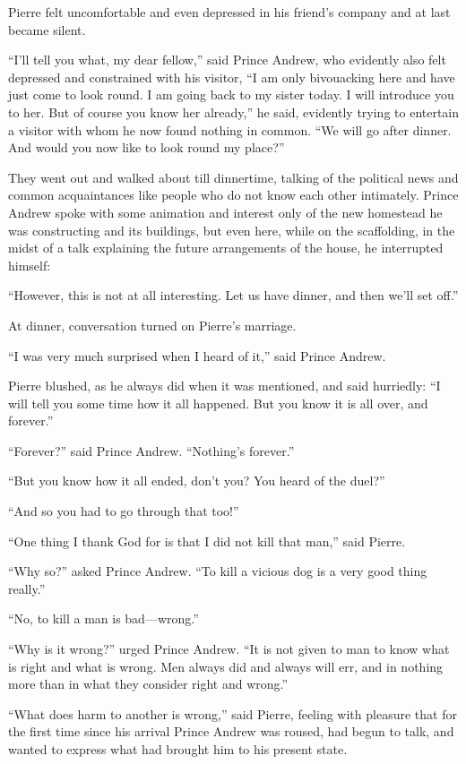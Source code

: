 Pierre felt uncomfortable and even depressed in his friend's
company and at last became silent.

``I'll tell you what, my dear fellow,'' said Prince Andrew, who
evidently also felt depressed and constrained with his visitor,
``I am only bivouacking here and have just come to look round. I
am going back to my sister today. I will introduce you to
her. But of course you know her already,'' he said, evidently
trying to entertain a visitor with whom he now found nothing in
common. ``We will go after dinner. And would you now like to look
round my place?''

They went out and walked about till dinnertime, talking of the
political news and common acquaintances like people who do not
know each other intimately. Prince Andrew spoke with some
animation and interest only of the new homestead he was
constructing and its buildings, but even here, while on the
scaffolding, in the midst of a talk explaining the future
arrangements of the house, he interrupted himself:

``However, this is not at all interesting. Let us have dinner,
and then we'll set off.''

At dinner, conversation turned on Pierre's marriage.

``I was very much surprised when I heard of it,'' said Prince
Andrew.

Pierre blushed, as he always did when it was mentioned, and said
hurriedly: ``I will tell you some time how it all happened. But
you know it is all over, and forever.''

``Forever?'' said Prince Andrew. ``Nothing's forever.''

``But you know how it all ended, don't you? You heard of the
duel?''

``And so you had to go through that too!''

``One thing I thank God for is that I did not kill that man,''
said Pierre.

``Why so?'' asked Prince Andrew. ``To kill a vicious dog is a
very good thing really.''

``No, to kill a man is bad---wrong.''

``Why is it wrong?'' urged Prince Andrew. ``It is not given to
man to know what is right and what is wrong. Men always did and
always will err, and in nothing more than in what they consider
right and wrong.''

``What does harm to another is wrong,'' said Pierre, feeling with
pleasure that for the first time since his arrival Prince Andrew
was roused, had begun to talk, and wanted to express what had
brought him to his present state.


